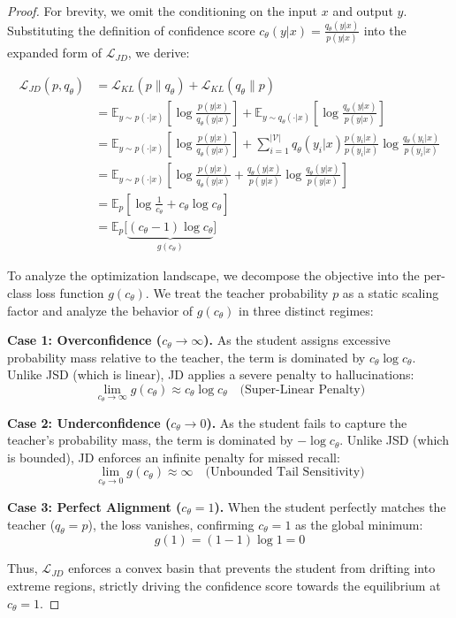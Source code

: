 \documentclass{article}
\theoremstyle{plain}
\theoremstyle{definition}
\theoremstyle{remark}
\begin{document}
\begin{proof}
For brevity, we omit the conditioning on the input $x$ and output $y$. Substituting the definition of confidence score $c_\theta (y|x) = \frac{q_\theta(y|x)}{p(y|x)}$ into the expanded form of $\mathcal{L}_{JD}$, we derive:

\begin{align}
    \mathcal{L}_{JD}(p,q_\theta) &= \mathcal{L}_{KL}(p \| q_\theta) + \mathcal{L}_{KL}(q_\theta \| p) \\
        &= \mathbb{E}_{y \sim p(\cdot|x)} \left[ \log \frac{p(y|x)}{q_\theta(y|x)} \right] + \mathbb{E}_{y \sim q_\theta(\cdot|x)} \left[ \log \frac{q_\theta(y|x)}{p(y|x)} \right] \\
        &= \mathbb{E}_{y \sim p(\cdot|x)} \left[ \log \frac{p(y|x)}{q_\theta(y|x)} \right] + \sum_{i=1}^{|\mathcal{V}|} q_\theta (y_i|x) \frac{p (y_i|x)}{p (y_i|x)} \log \frac{q_\theta (y_i|x)}{p(y_i|x)} \\
        &= \mathbb{E}_{y \sim p(\cdot|x)} \left[ \log \frac{p(y|x)}{q_\theta(y|x)} + \frac{q_\theta (y|x)}{p(y|x)} \log \frac{q_\theta (y|x)}{p(y|x)} \right] \\
        &= \mathbb{E}_{p} \left[ \log \frac{1}{c_\theta} + c_\theta \log c_\theta \right] \\
        &= \mathbb{E}_{p} \Big[ \underbrace{(c_\theta - 1) \log c_\theta}_{g(c_\theta)} \Big]
\end{align}

To analyze the optimization landscape, we decompose the objective into the per-class loss function $g(c_\theta)$. We treat the teacher probability $p$ as a static scaling factor and analyze the behavior of $g(c_\theta)$ in three distinct regimes:

\textbf{Case 1: Overconfidence ($c_{\theta} \to \infty$).} As the student assigns excessive probability mass relative to the teacher, the term is dominated by $c_\theta \log c_\theta$. Unlike JSD (which is linear), JD applies a severe penalty to hallucinations:
\[
    \lim_{c_{\theta} \to \infty} g(c_\theta) \approx c_\theta \log c_\theta \quad \text{(Super-Linear Penalty)}
\]

\textbf{Case 2: Underconfidence ($c_{\theta} \to 0$).} As the student fails to capture the teacher's probability mass, the term is dominated by $-\log c_\theta$. Unlike JSD (which is bounded), JD enforces an infinite penalty for missed recall:
\[
    \lim_{c_{\theta} \to 0} g(c_\theta) \approx \infty \quad \text{(Unbounded Tail Sensitivity)}
\]

\textbf{Case 3: Perfect Alignment ($c_{\theta} = 1$).} When the student perfectly matches the teacher ($q_\theta = p$), the loss vanishes, confirming $c_\theta=1$ as the global minimum:
\[
    g(1) = (1 - 1) \log 1 = 0
\]

Thus, $\mathcal{L}_{JD}$ enforces a convex basin that prevents the student from drifting into extreme regions, strictly driving the confidence score towards the equilibrium at $c_{\theta}=1$.
\end{proof}
\end{document}
